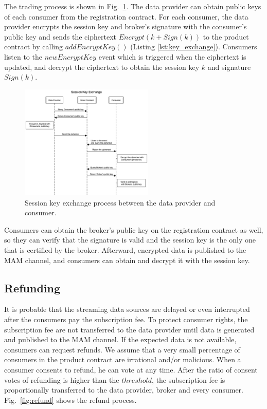 \documentclass[conference]{IEEEtran}
\begin{document}
The trading process is shown in Fig.~\ref{fig:key_exchange}. The data provider can obtain public keys of each consumer from the registration contract. For each consumer, the data provider encrypts the session key and broker's signature with the consumer's public key and sends the ciphertext $Encrypt(k + Sign(k))$ to the product contract by calling $addEncryptKey()$ (Listing \ref{lst:key_exchange}). Consumers listen to the $newEncryptKey$ event which is triggered when the ciphertext is updated, and decrypt the ciphertext to obtain the session key $k$ and signature $Sign(k)$.

\begin{figure}[!t]
    \centering
    \includegraphics[width=2.5in]{key_exchange}
    \caption{Session key exchange process between the data provider and consumer.}
    \label{fig:key_exchange}
\end{figure}

Consumers can obtain the broker's public key on the registration contract as well, so they can verify that the signature is valid and the session key is the only one that is certified by the broker. Afterward, encrypted data is published to the MAM channel, and consumers can obtain and decrypt it with the session key.

\subsection{Refunding}

It is probable that the streaming data sources are delayed or even interrupted after the consumers pay the subscription fee. To protect consumer rights, the subscription fee are not transferred to the data provider until data is generated and published to the MAM channel. If the expected data is not available, consumers can request refunds. We assume that a very small percentage of consumers in the product contract are irrational and/or malicious. When a consumer consents to refund, he can vote at any time. After the ratio of consent votes of refunding is higher than the $threshold$, the subscription fee is proportionally transferred to the data provider, broker and every consumer. Fig.~\ref{fig:refund} shows the refund process.
\end{document}

